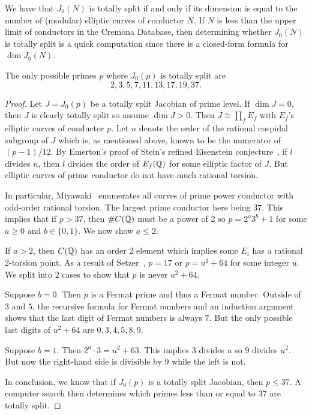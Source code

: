 \documentclass[11pt, proquest]{uwthesis}
\begin{document}
We have that $J_0(N)$ is totally split if and only if its dimension is equal to
the number of (modular) elliptic curves of conductor $N$. If $N$ is less than
the upper limit of conductors in the Cremona Database, then determining whether
$J_0(N)$ is totally split is a quick computation since there is a closed-form
formula for $\dim J_0(N)$.

\begin{lemma}
    \label{lem:good_primes}
    The only possible primes $p$ where $J_0(p)$ is totally split are
    \[
        2, 3, 5, 7, 11, 13, 17, 19, 37.
    \]
\end{lemma}
\begin{proof}
    Let $J=J_0(p)$ be a totally split Jacobian of prime level. If $\dim J=0$,
    then $J$ is clearly totally split so assume $\dim J>0$. Then $J\cong
    \prod_f E_f$ with $E_f$'s elliptic curves of conductor $p$. Let $n$ denote
    the order of the rational cuspidal subgroup of $J$ which is, as mentioned
    above, known to be the numerator of $(p-1)/12$. By Emerton's proof of
    Stein's refined Eisenstein conjecture~\cite[Theorem B]{emerton:optimal}, if
    $l$ divides $n$, then $l$ divides the order of $E_f(\mathbb{Q})$ for some elliptic
    factor of $J$. But elliptic curves of prime conductor do not have much
    rational torsion.

    In particular, Miyawaki~\cite{miyawaki:ell_prime} enumerates all curves of prime
    power conductor with odd-order rational torsion. The largest prime
    conductor here being 37. This implies that if $p>37$, then $\#C(\mathbb{Q})$ must
    be a power of 2 so $p=2^a 3^b + 1$ for some $a\geq 0$ and $b\in \{0,1\}$.
    We now show $a\leq 2$.

    If $a>2$, then $C(\mathbb{Q})$ has an order 2 element which implies some $E_i$ has
    a rational 2-torsion point. As a result of Setzer~\cite[Theorem
    2]{setzer:ell_prime}, $p=17$ or $p=u^2+64$ for some integer $u$. We split into 2
    cases to show that $p$ is never $u^2+64$.

    Suppose $b=0$. Then $p$ is a Fermat prime and thus a Fermat number. Outside
    of $3$ and $5$, the recursive formula for Fermat numbers and an induction
    argument shows that the last digit of Fermat numbers is always $7$. But the
    only possible last digits of $u^2+64$ are $0, 3, 4, 5, 8, 9$.

    Suppose $b=1$. Then $2^a\cdot 3 = u^2+63$. This implies $3$ divides $u$ so
    $9$ divides $u^2$. But now the right-hand side is divisible by $9$ while the
    left is not.

    In conclusion, we know that if $J_0(p)$ is a totally split Jacobian, then $p\leq
    37$. A computer search then determines which primes less than or equal to
    $37$ are totally split.
\end{proof}
\end{document}
